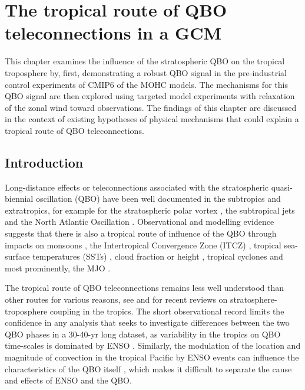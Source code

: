 \chapter{\label{ch:7-qbo} The tropical route of QBO teleconnections in a GCM }

This chapter examines the influence of the stratospheric QBO on the tropical troposphere by, first, demonstrating a robust QBO signal in the pre-industrial control experiments of CMIP6 of the MOHC models. The mechanisms for this QBO signal are then explored using targeted model experiments with relaxation of the zonal wind toward observations. The findings of this chapter are discussed in the context of existing hypotheses  of physical mechanisms that could explain a tropical route of QBO teleconnections.

\section{Introduction}

Long-distance effects or teleconnections associated with the stratospheric quasi-biennial oscillation (QBO) have been well documented in the subtropics and extratropics, for example for the stratospheric polar vortex \citep{holton1980,anstey2014,lu2020}, the subtropical jets \citep{garfinkel2011,hansen2016tropospheric,ma2021} and the North Atlantic Oscillation \citep{hansen2016tropospheric,gray2018,andrews2019observed}.  
 Observational and modelling evidence suggests that there is also a tropical route of influence of the QBO through impacts on monsoons \citep{giorgetta1999,claud2007revisiting,liess2012}, the Intertropical Convergence Zone (ITCZ) \citep{gray2018}, tropical sea-surface temperatures (SSTs) \citep{garfinkel2011,huang2012connection}, cloud fraction or height \citep{liess2012,pena2019tropical}, tropical cyclones \citep{ho2009,jaramillo2021combined} and most prominently, the MJO \citep{son2017,lee2018,wang2019,martin2021nature}.
 
The tropical route of QBO teleconnections remains less well understood than other routes for various reasons, see \cite{haynes2021influence} and \cite{hitchman2021observational} for recent reviews on stratosphere-troposphere coupling in the tropics. The short observational record limits the confidence in any analysis that seeks to investigate differences between the two QBO phases in a 30-40-yr long dataset, as variability in the tropics on QBO time-scales is dominated by ENSO \citep{liess2012,seo2013,gray2018}. Similarly, the modulation of the location and magnitude of convection in the tropical Pacific by ENSO events can influence the characteristics of the QBO itself \citep{taguchi2010,schirber2015,christiansen2016,serva2020}, which makes it difficult to separate the cause and effects of ENSO and the QBO. 



